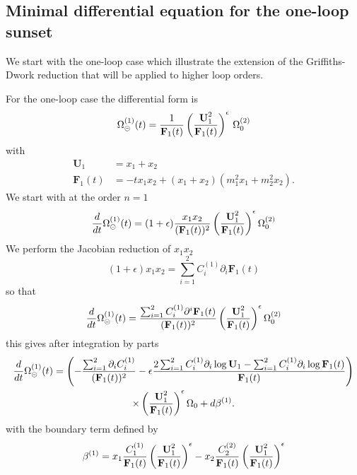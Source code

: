\documentclass[a4paper,12pt]{article}
\numberwithin{equation}{section}
\numberwithin{figure}{subsection}
\theoremstyle{plain}
\theoremstyle{plain}
\theoremstyle{definition}
\theoremstyle{plain}
\theoremstyle{remark}
\theoremstyle{plain}
\def\su{\circleddash}
\begin{document}
\subsection{Minimal differential equation for the one-loop sunset}\label{sec:one-loop-case}

We start with the one-loop case which illustrate the extension of the
Griffiths-Dwork reduction that will be applied to higher loop orders.


For the one-loop case the differential form is
\begin{equation}
  \Omega_\su^{(1)}(t)={1\over
    \textbf{F}_1(t)}\left(\textbf{U}_1^2\over \textbf{F}_1(t)\right)^\epsilon  \,\Omega_0^{(2)}
\end{equation}
with
\begin{align}
 \textbf{U}_1&=x_1+x_2\\
  \textbf{F}_1(t)&=-tx_1x_2+(x_1+x_2)(m_1^2x_1+m_2^2x_2).
\end{align}
We start with at the order $n=1$
\begin{equation}
{ d\over dt}
 \Omega^{(1)}_\su(t)= (1+\epsilon){x_1x_2\over (\textbf{F}_1(t))^2}
 \left(\textbf{U}_1^2\over \textbf{F}_1(t)\right)^\epsilon  \Omega_0^{(2)}
\end{equation}
%
We perform the Jacobian reduction of $x_1x_2$
\begin{equation}\label{e:reduc1loop}
 (1+\epsilon) x_1x_2= \sum_{i=1}^2 C_i^{(1)}\partial_i \textbf{F}_1(t)
\end{equation}
%
so that
\begin{equation}
{ d\over dt}
 \Omega^{(1)}_\su(t)= {\sum_{i=1}^2 C_i^{(1)}\partial^i \textbf{F}_1(t)\over (\textbf{F}_1(t))^2}
 \left(\textbf{U}_1^2\over \textbf{F}_1(t)\right)^\epsilon  \Omega_0^{(2)}
\end{equation}
this gives after integration by parts
\begin{multline}\label{e:PF1loopstep1}
 {d\over dt}
 \Omega^{(1)}_\su(t)=
 \left(-{\sum_{i=1}^2 \partial_i C_i^{(1)}\over
     (\textbf{F}_1(t))^2}-\epsilon{2\sum_{i=1}^2 C_i^{(1)}\partial_i
     \log \textbf{U}_1-\sum_{i=1}^2 C_i^{(1)}\partial_i
     \log \textbf{F}_1(t)\over \textbf{F}_1(t)}\right)\cr \times\left(\textbf{U}_1^2\over \textbf{F}_1(t)\right)^\epsilon \Omega_0+d\beta^{(1)}.
\end{multline}
%
with the boundary term defined by
\begin{equation}
  \beta^{(1)}=x_1  {C_1^{(1)}  \over  \textbf{F}_1(t) } \left(\textbf{U}_{1}^2\over
    \textbf{F}_1(t)\right)^\epsilon -  x_2  {C_2^{(2)}  \over  \textbf{F}_1(t) } \left(\textbf{U}_1^2\over
    \textbf{F}_1(t)\right)^\epsilon
\end{equation}
\end{document}
